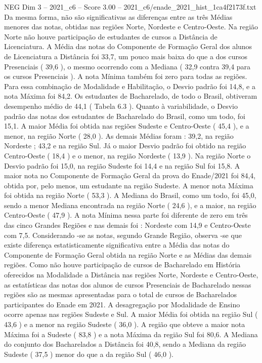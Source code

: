 \begin{textsample}{NEG Dim 3 – 2021\_c6 – Score 3.00 – 2021\_c6/enade\_2021\_hist\_1ca4f2173f.txt}
Da mesma forma, não são significativas as diferenças entre as três Médias menores das notas, obtidas nas regiões Norte, Nordeste e Centro-Oeste.
Na região Norte não houve participação de estudantes de cursos a Distância de Licenciatura.
A Média das notas do Componente de Formação Geral dos alunos de Licenciatura a Distância foi 33,7, um pouco mais baixa do que a dos cursos Presenciais ( 39,6 ), o mesmo ocorrendo com a Mediana ( 32,9 contra 39,4 para os cursos Presenciais ).
A nota Mínima também foi zero para todas as regiões.
Para essa combinação de Modalidade e Habilitação, o Desvio padrão foi 14,8, e a nota Máxima foi 84,2.
Os estudantes de Bacharelado, de todo o Brasil, obtiveram desempenho médio de 44,1 ( Tabela 6.3 ).
Quanto à variabilidade, o Desvio padrão das notas dos estudantes de Bacharelado do Brasil, como um todo, foi 15,1.
A maior Média foi obtida nas regiões Sudeste e Centro-Oeste ( 45,4 ), e a menor, na região Norte ( 28,0 ).
As demais Médias foram : 39,2, na região Nordeste ; 43,2 e na região Sul.
Já o maior Desvio padrão foi obtido na região Centro-Oeste ( 18,4 ) e o menor, na região Nordeste ( 13,9 ).
Na região Norte o Desvio padrão foi 15,0, na região Sudeste foi 14,4 e na região Sul foi 15,8.
A maior nota no Componente de Formação Geral da prova do Enade/2021 foi 84,4, obtida por, pelo menos, um estudante na região Sudeste.
A menor nota Máxima foi obtida na região Norte ( 53,3 ).
A Mediana do Brasil, como um todo, foi 45,0, sendo a menor Mediana encontrada na região Norte ( 24,6 ), e a maior, na região Centro-Oeste ( 47,9 ).
A nota Mínima nessa parte foi diferente de zero em três das cinco Grandes Regiões e nas demais foi : Nordeste com 14,9 e Centro-Oeste com 7,5.
Considerando -se as notas, segundo Grande Região, observa -se que existe diferença estatisticamente significativa entre a Média das notas do Componente de Formação Geral obtida na região Norte e as Médias das demais regiões.
Como não houve participação de cursos de Bacharelado em História oferecidos na Modalidade a Distância nas regiões Norte, Nordeste e Centro-Oeste, as estatísticas das notas dos alunos de cursos Presenciais de Bacharelado nessas regiões são as mesmas apresentadas para o total de cursos de Bacharelados participantes do Enade em 2021.
A desagregação por Modalidade de Ensino ocorre apenas nas regiões Sudeste e Sul.
A maior Média foi obtida na região Sul ( 43,6 ) e a menor na região Sudeste ( 36,0 ).
A região que obteve a maior nota Máxima foi a Sudeste ( 83,8 ) e a nota Máxima da região Sul foi 80,6.
A Mediana do conjunto dos Bacharelados a Distância foi 40,8, sendo a Mediana da região Sudeste ( 37,5 ) menor do que a da região Sul ( 46,0 ).

\end{textsample}
